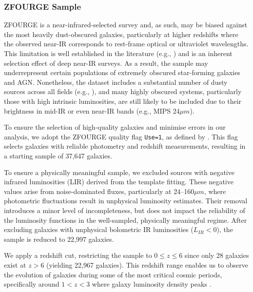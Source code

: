 \subsubsection{ZFOURGE Sample} \label{Sec: Galaxy LF Selection}
ZFOURGE is a near-infrared-selected survey and, as such, may be biased against the most heavily dust-obscured galaxies, particularly at higher redshifts where the observed near-IR corresponds to rest-frame optical or ultraviolet wavelengths. This limitation is well established in the literature (e.g., \citealp{fu_decomposing_2010, grazian_galaxy_2015}) and is an inherent selection effect of deep near-IR surveys. As a result, the sample may underrepresent certain populations of extremely obscured star-forming galaxies and AGN. Nonetheless, the dataset includes a substantial number of dusty sources across all fields (e.g., \citealp{spitler_exploring_2014}), and many highly obscured systems, particularly those with high intrinsic luminosities, are still likely to be included due to their brightness in mid-IR or even near-IR bands (e.g., MIPS 24$\mu m$). 

To ensure the selection of high-quality galaxies and minimise errors in our analysis, we adopt the ZFOURGE quality flag \texttt{Use=1}, as defined by \cite{straatman_fourstar_2016}. This flag selects galaxies with reliable photometry and redshift measurements, resulting in a starting sample of 37,647 galaxies.

To ensure a physically meaningful sample, we excluded sources with negative infrared luminosities (LIR) derived from the \cite{wuyts_fireworks_2008} template fitting. These negative values arise from noise-dominated fluxes, particularly at 24–160$\mu m$, where photometric fluctuations result in unphysical luminosity estimates. Their removal introduces a minor level of incompleteness, but does not impact the reliability of the luminosity functions in the well-sampled, physically meaningful regime. After excluding galaxies with unphysical bolometric IR luminosities ($L_{IR} < 0$), the sample is reduced to 22,997 galaxies. 

We apply a redshift cut, restricting the sample to $0 \leq z \leq 6$ since only 28 galaxies exist at $z > 6$ (yielding  22,967 galaxies). This redshift range enables us to observe the evolution of galaxies during some of the most critical cosmic periods, specifically around $1 < z < 3$ \citep{gruppioni_modelling_2011, wylezalek_galaxy_2014} where galaxy luminosity density peaks \citep{assef_mid-ir-_2011}.


